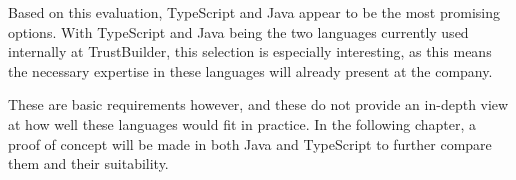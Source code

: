 Based on this evaluation, TypeScript and Java appear to be the most promising options. With TypeScript and Java being the two languages currently used internally at TrustBuilder, this selection is especially interesting, as this means the necessary expertise in these languages will already present at the company. 

These are basic requirements however, and these do not provide an in-depth view at how well these languages would fit in practice. In the following chapter, a proof of concept will be made in both Java and TypeScript to further compare them and their suitability.
